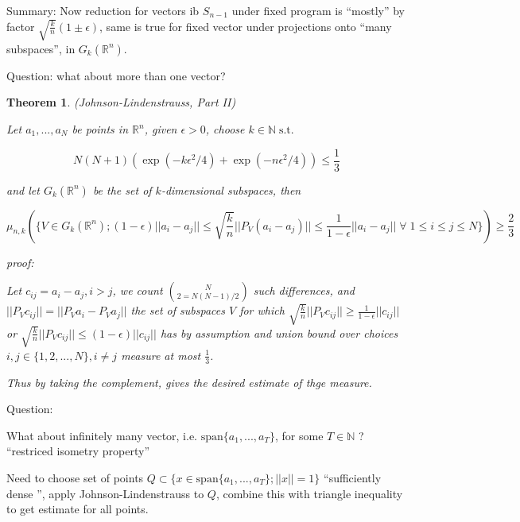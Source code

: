 \documentclass[12pt]{article}
\newtheorem{thm}{Theorem}[section]
\theoremstyle{remark}
\def\eps{\epsilon}
\newcommand{\nats}[0] { \mathbb{N}}
\newcommand{\reals}[0] { \mathbb{R}}
\newcommand{\st}[0]{ \; \textrm{s.t.} \; }
\begin{document}
Summary: Now reduction for vectors ib $S_{n-1}$ under fixed program is ``mostly'' by factor $\sqrt{\frac{k}{n}}(1 \pm \eps )$, same is true for fixed vector under projections onto ``many subspaces'', in $G_k(\reals^n)$.

Question: what about more than one vector?

\begin{thm}

(Johnson-Lindenstrauss, Part II)

Let $a_1, ..., a_N$ be points in $\reals^n$, given $\eps>0$, choose $k \in \nats \st$

$$
	N(N+1) ( \exp(-k \eps^2/4) + \exp(-n \eps^2/4) ) \le \frac{1}{3}
$$

and let $G_k( \reals^n )$ be the set of $k$-dimensional subspaces, then

$$
	\mu_{n,k} (\{ V \in G_k( \reals^n ) ; (1-\eps) || a_i - a_j|| \le \sqrt{\frac{k}{n}} || P_V(a_i - a_j)|| \le \frac{1}{1-\eps} || a_i - a_j||  \; \forall \; 1 \le i \le j \le N \}) \ge \frac{2}{3}
$$

proof:

Let $c_{ij} = a_i-a_j, i>j$, we count $N \choose 2 = N(N-1)/2$ such differences, and $ ||P_V c_{ij}|| = ||P_V a_i - P_V a_j ||$ the set of subspaces $V$ for which $\sqrt{\frac{k}{n}} || P_V c_{ij} || \ge \frac{1}{1-\eps} ||c_{ij}||$ or $\sqrt{\frac{k}{n}} || P_V c_{ij} || \le (1-\eps) ||c_{ij}||$ has by assumption and union bound over choices $i,j \in \{ 1,2,...,N\}, i \not = j$ measure at most $\frac{1}{3}$.

Thus by taking the complement, gives the desired estimate of thge measure.

\end{thm}

Question:

What about infinitely many vector, i.e. $ \textrm{span} \{ a_1, ..., a_T \}$, for some $T \in \nats$ ? ``restriced isometry property''

Need to choose set of points $Q \subset \{ x \in \textrm{span} \{ a_1, ..., a_T \};  ||x|| =1 \}$  ``sufficiently dense '', apply Johnson-Lindenstrauss to $Q$, combine this with triangle inequality to get estimate for all points. 
\end{document}
